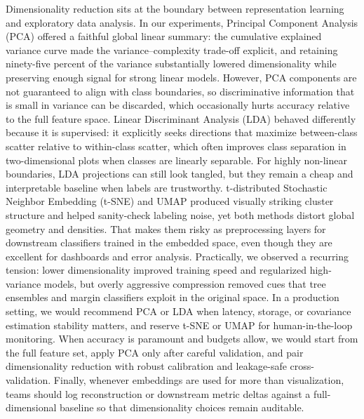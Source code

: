 Dimensionality reduction sits at the boundary between representation learning and exploratory data analysis. In our experiments, Principal Component Analysis (PCA) offered a faithful global linear summary: the cumulative explained variance curve made the variance--complexity trade-off explicit, and retaining ninety-five percent of the variance substantially lowered dimensionality while preserving enough signal for strong linear models. However, PCA components are not guaranteed to align with class boundaries, so discriminative information that is small in variance can be discarded, which occasionally hurts accuracy relative to the full feature space. Linear Discriminant Analysis (LDA) behaved differently because it is supervised: it explicitly seeks directions that maximize between-class scatter relative to within-class scatter, which often improves class separation in two-dimensional plots when classes are linearly separable. For highly non-linear boundaries, LDA projections can still look tangled, but they remain a cheap and interpretable baseline when labels are trustworthy. t-distributed Stochastic Neighbor Embedding (t-SNE) and UMAP produced visually striking cluster structure and helped sanity-check labeling noise, yet both methods distort global geometry and densities. That makes them risky as preprocessing layers for downstream classifiers trained in the embedded space, even though they are excellent for dashboards and error analysis. Practically, we observed a recurring tension: lower dimensionality improved training speed and regularized high-variance models, but overly aggressive compression removed cues that tree ensembles and margin classifiers exploit in the original space. In a production setting, we would recommend PCA or LDA when latency, storage, or covariance estimation stability matters, and reserve t-SNE or UMAP for human-in-the-loop monitoring. When accuracy is paramount and budgets allow, we would start from the full feature set, apply PCA only after careful validation, and pair dimensionality reduction with robust calibration and leakage-safe cross-validation. Finally, whenever embeddings are used for more than visualization, teams should log reconstruction or downstream metric deltas against a full-dimensional baseline so that dimensionality choices remain auditable.
